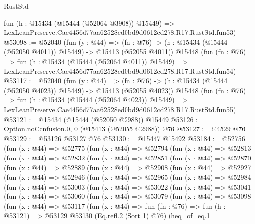 \begin{lexlean}{RustStd}
\begin{coremodule}
    fun (h : @15434 (@15444 (@52064 @3908)) @15449) =>
    LexLeanPreserve.Cae4456d77aa62528ed0bd9d0612cd278.R17.RustStd.fun53)
@53098 := @52040
    (fun (y : @44) =>
    (fn : @76) -> (h : @15434 (@15444 (@52050 @4011)) @15449) -> @15413 (@52055 @4011))
    @15448
    (fun (fn : @76) =>
    fun (h : @15434 (@15444 (@52064 @4011)) @15449) =>
    LexLeanPreserve.Cae4456d77aa62528ed0bd9d0612cd278.R17.RustStd.fun54)
@53117 := @52040
    (fun (y : @44) =>
    (fn : @76) -> (h : @15434 (@15444 (@52050 @4023)) @15449) -> @15413 (@52055 @4023))
    @15448
    (fun (fn : @76) =>
    fun (h : @15434 (@15444 (@52064 @4023)) @15449) =>
    LexLeanPreserve.Cae4456d77aa62528ed0bd9d0612cd278.R17.RustStd.fun55)
@53121 := @15434 (@15444 (@52050 @2988)) @15449
@53126 := Option.noConfusion.{0, 0} (@15413 (@52055 @2988)) @76
@53127 := @4529 @76
@53129 := @53126 @53127 @76
@53130 := @15447 @15492
@53184 := @52756
    (fun (x : @44) =>
    @52775
      (fun (x : @44) =>
      @52794
        (fun (x : @44) =>
        @52813
          (fun (x : @44) =>
          @52832
            (fun (x : @44) =>
            @52851
              (fun (x : @44) =>
              @52870
                (fun (x : @44) =>
                @52889
                  (fun (x : @44) =>
                  @52908
                    (fun (x : @44) =>
                    @52927
                      (fun (x : @44) =>
                      @52946
                        (fun (x : @44) =>
                        @52965
                          (fun (x : @44) =>
                          @52984
                            (fun (x : @44) =>
                            @53003
                              (fun (x : @44) =>
                              @53022
                                (fun (x : @44) =>
                                @53041
                                  (fun (x : @44) =>
                                  @53060
                                    (fun (x : @44) =>
                                    @53079
                                      (fun (x : @44) =>
                                      @53098
                                        (fun (x : @44) =>
                                        @53117
                                          (fun (x : @44) =>
                                          fun (fn : @76) =>
                                          fun (h : @53121) =>
                                          @53129
                                            @53130
                                            (Eq.refl.{2} (Sort 1) @76)
                                            (heq_of_eq.{1}

\end{coremodule}
\end{lexlean}
